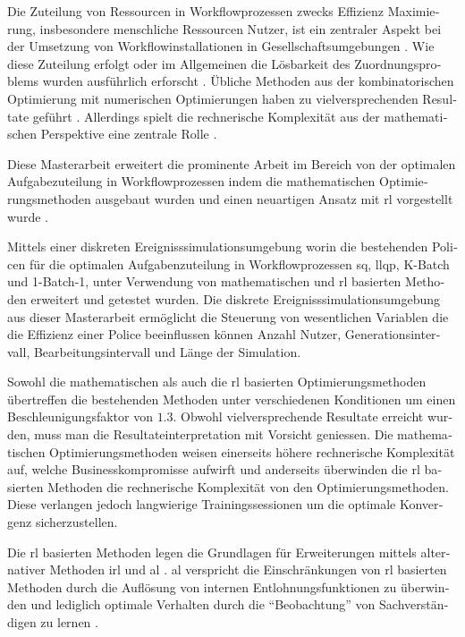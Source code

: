 \begin{otherlanguage}{ngerman}
	\begin{zusammenfassung}


	Die Zuteilung von Ressourcen in Workflowprozessen zwecks Effizienz Maximierung, insbesondere menschliche Ressourcen \dhg Nutzer, ist ein zentraler Aspekt bei der Umsetzung von Workflowinstallationen in Gesellschaftsumgebungen \citep{Mentzas2001}. Wie diese Zuteilung erfolgt oder im Allgemeinen die Lösbarkeit des Zuordnungsproblems wurden ausführlich erforscht \citep{Zeng2005}. Übliche Methoden aus der kombinatorischen Optimierung mit numerischen Optimierungen haben zu vielversprechenden Resultate geführt \citep{Zeng2005}. Allerdings spielt die rechnerische Komplexität aus der mathematischen Perspektive eine zentrale Rolle \citep{Zeng2005}.

	Diese Masterarbeit erweitert die prominente Arbeit im Bereich von der optimalen Aufgabezuteilung in Workflowprozessen indem die mathematischen Optimierungsmethoden ausgebaut wurden und einen neuartigen Ansatz mit \gls{rl} vorgestellt wurde \citep{Sutton2017}.

	Mittels einer diskreten Ereignisssimulationsumgebung worin die bestehenden Policen für die optimalen Aufgabenzuteilung in Workflowprozessen \zbg \gls{sq}, \gls{llqp}, K-Batch und 1-Batch-1, unter Verwendung von mathematischen und \gls{rl} basierten Methoden erweitert und getestet wurden. Die diskrete Ereignisssimulationsumgebung aus dieser Masterarbeit ermöglicht die Steuerung von wesentlichen Variablen die die Effizienz einer Police beeinflussen können \zbg Anzahl Nutzer, Generationsintervall, Bearbeitungsintervall und Länge der Simulation.

	Sowohl die mathematischen als auch die \gls{rl} basierten Optimierungsmethoden übertreffen die bestehenden Methoden unter verschiedenen Konditionen um einen Beschleunigungsfaktor von $1.3$. Obwohl vielversprechende Resultate erreicht wurden, muss man die Resultateinterpretation mit Vorsicht geniessen. Die mathematischen Optimierungsmethoden weisen einerseits höhere rechnerische Komplexität auf, welche Businesskompromisse aufwirft und anderseits überwinden die \gls{rl} basierten Methoden die rechnerische Komplexität von den Optimierungsmethoden. Diese verlangen jedoch langwierige Trainingssessionen um die optimale Konvergenz sicherzustellen.

	Die \gls{rl} basierten Methoden legen die Grundlagen für Erweiterungen mittels alternativer Methoden \zbg \gls{irl} \citep{Ng2000} und \gls{al} \citep{Abbeel2004}. \gls{al} verspricht die Einschränkungen von \gls{rl} basierten Methoden durch die Auflösung von internen Entlohnungsfunktionen zu überwinden und lediglich optimale Verhalten durch die ``Beobachtung'' von Sachverständigen zu lernen \citep{Abbeel2004}.
	\end{zusammenfassung}
\end{otherlanguage}